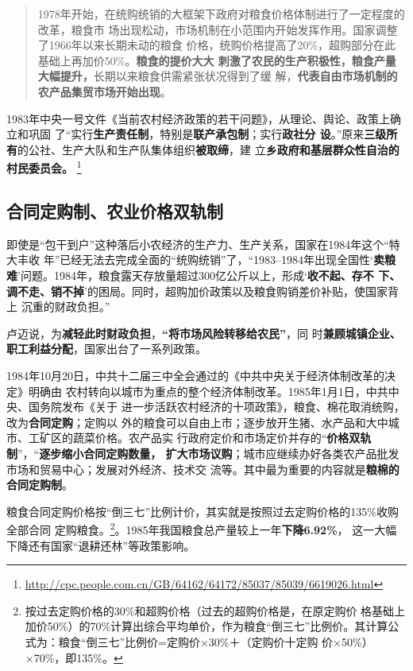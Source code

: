 \begin{quotation}
  1978年开始，在统购统销的大框架下政府对粮食价格体制进行了一定程度的改革，粮食市
  场出现松动，市场机制在小范围内开始发挥作用。国家调整了1966年以来长期未动的粮食
  价格，统购价格提高了20\%，超购部分在此基础上再加价50\%。\textbf{粮食的提价大大
    刺激了农民的生产积极性，粮食产量大幅提升，}长期以来粮食供需紧张状况得到了缓
  解，\textbf{代表自由市场机制的农产品集贸市场开始出现}。\cite{taochangsheng}
\end{quotation}

1983年中央一号文件《当前农村经济政策的若干问题》，从理论、舆论、政策上确立和巩固
了“实行\textbf{生产责任制}，特别是\textbf{联产承包制}；实行\textbf{政社分
  设}。”原来\textbf{三级所有}的公社、生产大队和生产队集体组织\textbf{被取缔}，建
立\textbf{乡政府和基层群众性自治的村民委员会。}
\footnote{\url{http://cpc.people.com.cn/GB/64162/64172/85037/85039/6619026.html}}

\subsection{合同定购制、农业价格双轨制}
\label{sec:nongshuanggui}

即使是“包干到户”这种落后小农经济的生产力、生产关系，国家在1984年这个“特大丰收
年”已经无法去完成全面的“统购统销”了，“1983--1984年出现全国性‘\textbf{卖粮
  难}’问题。1984年，粮食露天存放量超过300亿公斤以上，形成‘\textbf{收不起、存不
  下、调不走、销不掉}’的困局。同时，超购加价政策以及粮食购销差价补贴，使国家背上
沉重的财政负担。”\cite{liangshi40}

卢迈说，为\textbf{减轻此时财政负担}，\textbf{“将市场风险转移给农民”}，同
时\textbf{兼顾城镇企业、职工利益分配}，国家出台了一系列政策。

1984年10月20日，中共十二届三中全会通过的《中共中央关于经济体制改革的决定》明确由
农村转向以城市为重点的整个经济体制改革。1985年1月1日，中共中央、国务院发布《关于
进一步活跃农村经济的十项政策》，粮食、棉花取消统购，改为\textbf{合同定购}；定购以
外的粮食可以自由上市；逐步放开生猪、水产品和大中城市、工矿区的蔬菜价格。农产品实
行政府定价和市场定价并存的“\textbf{价格双轨制}”，“\textbf{逐步缩小合同定购数量，
  扩大市场议购}；城市应继续办好各类农产品批发市场和贸易中心；发展对外经济、技术交
流等。其中最为重要的内容就是\textbf{粮棉的合同定购制}。

粮食合同定购价格按“倒三七”比例计价，其实就是按照过去定购价格的135\%收购全部合同
定购粮食。\footnote{按过去定购价格的30\%和超购价格（过去的超购价格是，在原定购价
  格基础上加价50\%）的70\%计算出综合平均单价，作为粮食“倒三七”比例价。其计算公
  式为：粮食“倒三七”比例价=定购价×30\%＋（定购价十定购
  价×50\%）×70\%，即135\%。}。1985年我国粮食总产量较上一年\textbf{下降6.92\%}，
这一大幅下降还有国家“退耕还林”等政策影响。

